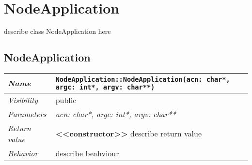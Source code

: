 \chapter{NodeApplication}
describe class NodeApplication here
\section{NodeApplication}
\begin{longtable}{p{3cm} @{\hskip 1cm} p{12cm}}
 \hline
\textit{Name} & \texttt{NodeApplication::NodeApplication(acn: char*, argc: int*, argv: char**)}\\
\hline
 \textit{Visibility} & public\\
\hline
\textit{Parameters} & \textit{acn: char*, argc: int*, argv: char**}\\
\hline
\textit{Return value} & \textbf{ <<constructor>>} describe return value\\
  \hline
 \textit{Behavior} & describe beahviour \\
\hline
\end{longtable} \pagebreak
 